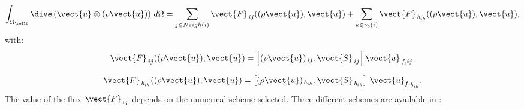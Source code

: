 \begin{equation*}
\int_{\Omega_\celli}{\dive\left(\vect{u}\otimes (\rho \vect{u})\right)\, d\Omega} =
\sum_{j\in Neigh(i)}{\vect{F}_{\,ij}((\rho \vect{u}), \vect{u})} \\
+\sum_{k\in {\gamma_b(i)}} {\vect{F}_{\,{b}_{ik}}((\rho \vect{u}),\vect{u})} ,
\end{equation*}
%
with:
\begin{equation}
\vect{F}_{\,ij}((\rho \vect{u}), \vect{u}) = \left[{(\rho \vect{u})_{\,ij}} \text{.}\, \vect{S}_{\,ij}\right]
 \vect{u}_{\,f,ij}.
\end{equation}

\begin{equation}
{\vect{F}_{\,{b}_{ik}}}((\rho \vect{u}),\vect{u}) =  \left[{(\rho \vect{u})_{\,{b}_{ik}}} \text{.}\, \vect{S}_{\,{b}_{ik}}\right]\,{\vect{u}_f}_{\,{b}_{ik}}.
\end{equation}
The value of the flux ${\vect{F}_{\,ij}}$ depends on the numerical scheme
selected. Three different schemes are available in \CS:
%
